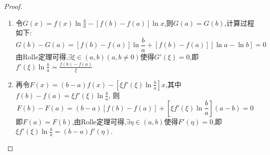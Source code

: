 \begin{proof}
	\begin{enumerate}
		\item 令$
			      G\left( x \right) =f\left( x \right) \ln \frac{b}{a}-\left[ f\left( b \right) -f\left( a \right) \right] \ln x
		      $,则$G(a)=G(b)$,计算过程如下:
		      $$
			      G\left( b \right) -G\left( a \right) =\left[ f\left( b \right) -f\left( a \right) \right] \ln \frac{b}{a}+\left[ f\left( b \right) -f\left( a \right) \right] \left[ \ln a-\ln b \right] =0
		      $$
		      由Rolle定理可得,$\exists \xi \in (a,b)(a,b \ne 0)$使得$G'(\xi)=0$,即$
			      f'\left( \xi \right) \ln \frac{b}{a}=\frac{f\left( b \right) -f\left( a \right)}{\xi}
		      $
		\item 再令$
			      F\left( x \right) =\left( b-a \right) f\left( x \right) -\left[ \xi f'\left( \xi \right) \ln \frac{b}{a} \right] x
		      $,其中$
			      f\left( b \right) -f\left( a \right) =\xi f'\left( \xi \right) \ln \frac{b}{a}
		      $,
		      则$$
			      F\left( b \right) -F\left( a \right) =\left( b-a \right) \left[ f\left( b \right) -f\left( a \right) \right] +\left[ \xi f'\left( \xi \right) \ln \frac{b}{a} \right] \left( a-b \right) =0
		      $$
		      即$F(a)=F(b)$,由Rolle定理可得,$\exists \eta \in (a,b)$使得$F'(\eta)=0$,即$\xi f'\left( \xi \right) \ln \frac{b}{a}=\left( b-a \right) f'\left( \eta \right)$.
	\end{enumerate}
\end{proof}
